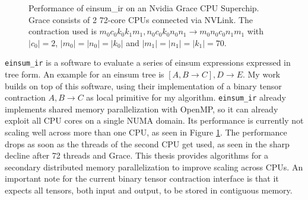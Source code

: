 \begin{figure}[ht]
  \caption{
    Performance of einsum\_ir on an Nvidia Grace CPU Superchip.
    Grace consists of 2 72-core CPUs connected via NVLink.
    The contraction used is $m_0c_0k_0k_1m_1, n_0c_0k_0n_0n_1 \rightarrow m_0n_0c_0n_1m_1$ with $|c_0|=2$, $|m_0|=|n_0|=|k_0|$ and $|m_1|=|n_1|=|k_1|=70$.
  }
  \label{fig:perf_threads}
\end{figure}

\texttt{einsum\_ir}\cite{einsum_ir} is a software to evaluate a series of einsum expressions expressed in tree form.
An example for an einsum tree is $[A,B\rightarrow C],D \rightarrow E$.
My work builds on top of this software, using their implementation of a binary tensor contraction $A,B \rightarrow C$ as local primitive for my algorithm.
\texttt{einsum\_ir} already implements shared memory parallelization with OpenMP\cite{openMP}, so it can already exploit all CPU cores on a single NUMA domain.
Its performance is currently not scaling well across more than one CPU, as seen in Figure \ref{fig:perf_threads}.
The performance drops as soon as the threads of the second CPU get used, as seen in the sharp decline after 72 threads and Grace.
This thesis provides algorithms for a secondary distributed memory parallelization to improve scaling across CPUs.
An important note for the current binary tensor contraction interface is that it expects all tensors, both input and output, to be stored in contiguous memory.
